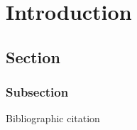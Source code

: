 \chapter{Introduction}
\section{Section}
\subsection{Subsection}

Bibliographic citation\cite{ec2web}